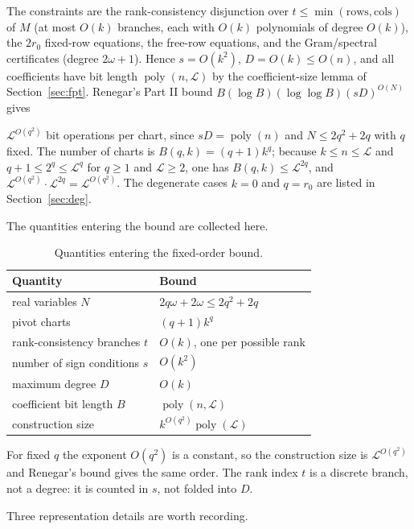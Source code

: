 \documentclass[journal]{IEEEtran}
\theoremstyle{plainn}
\begin{document}
The constraints are the rank-consistency disjunction over $t\le\min(\text{rows},\text{cols})$ of $M$ (at most $O(k)$ branches, each with $O(k)$ polynomials of degree $O(k)$), the $2r_0$ fixed-row equations, the free-row equations, and the Gram/spectral certificates (degree $2\omega+1$). Hence $s=O(k^2)$, $D=O(k)\le O(n)$, and all coefficients have bit length $\operatorname{poly}(n,\mathcal L)$ by the coefficient-size lemma of Section~\ref{sec:fpt}. Renegar's Part II bound $B(\log B)(\log\log B)(sD)^{O(N)}$ gives

$\mathcal L^{O(q^2)}$ bit operations per chart, since $sD=\operatorname{poly}(n)$ and $N\le2q^2+2q$
with $q$ fixed. The number of charts is $B(q,k)=(q+1)k^{q}$; because $k\le n\le\mathcal L$ and
$q+1\le2^{q}\le\mathcal L^{q}$ for $q\ge1$ and $\mathcal L\ge2$, one has $B(q,k)\le\mathcal L^{2q}$,
and $\mathcal L^{O(q^2)}\cdot\mathcal L^{2q}=\mathcal L^{O(q^2)}$. The degenerate cases $k=0$ and
$q=r_0$ are listed in Section~\ref{sec:deg}.

The quantities entering the bound are collected here.

\begin{table}[!t]
\centering
\caption{Quantities entering the fixed-order bound.}\label{tab:4}
\small
\begin{tabular}{p{}p{}}
\toprule
Quantity & Bound \\
\midrule
real variables $N$ & $2q\omega+2\omega\le2q^2+2q$ \\
pivot charts & $(q+1)k^q$ \\
rank-consistency branches $t$ & $O(k)$, one per possible rank \\
number of sign conditions $s$ & $O(k^2)$ \\
maximum degree $D$ & $O(k)$ \\
coefficient bit length $B$ & $\operatorname{poly}(n,\mathcal L)$ \\
construction size & $k^{O(q^2)}\operatorname{poly}(\mathcal L)$ \\
\bottomrule
\end{tabular}
\end{table}
For fixed $q$ the exponent $O(q^2)$ is a constant, so the construction size is $\mathcal L^{O(q^2)}$ and Renegar's bound gives the same order. The rank index $t$ is a discrete branch, not a degree: it is counted in $s$, not folded into $D$.

Three representation details are worth recording.
\end{document}
